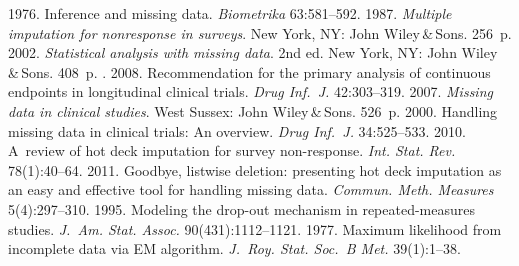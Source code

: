 








  \begin{multicols}{2}

\renewcommand{\bibname}{\protect\rmfamily References}

{\small\frenchspacing
 {%
 \begin{thebibliography}{99}
 1976. Inference and missing data. \textit{Biometrika}  
63:581--592. 
 1987. \textit{Multiple imputation for nonresponse in surveys}. 
New York, NY: John Wiley\,\&\,Sons. 256~p.
 2002. \textit{Statistical analysis with 
missing data}. 2nd ed. New York, NY: John Wiley\,\&\,Sons. 408~p.
. 
2008. Recommendation for the primary analysis of continuous endpoints in 
longitudinal clinical trials. \textit{Drug Inf.~J.} 42:303--319.
 2007. \textit{Missing data in clinical 
studies}. West Sussex: John Wiley\,\&\,Sons. 526~p.
 2000. Handling missing data in clinical trials: An overview. 
\textit{Drug Inf.~J.} 34:525--533.
 2010. A~review of hot deck imputation 
for survey non-response. \textit{Int. Stat. Rev.} 78(1):40--64.
 2011. Goodbye, listwise deletion: presenting hot deck 
imputation as an easy and effective tool for handling missing data. 
\textit{Commun. Meth. Measures} 5(4):297--310.
 1995. Modeling the drop-out mechanism in  
repeated-measures studies. \textit{J.~Am. Stat. Assoc.} 
90(431):1112--1121.
 1977. Maximum 
likelihood from incomplete data via EM algorithm. \textit{J.~Roy. Stat. Soc.~B 
Met.} 39(1):1--38.

\end{thebibliography}}}
\end{multicols}
